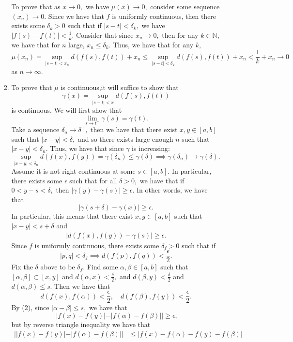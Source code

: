 \documentclass[11pt]{article}
\newcommand{\bbN}{\mathbb{N}}
\begin{document}
\begin{enumerate}
\begin{solution}
\begin{itemize}
\begin{enumerate}
            To prove that as $x\to 0,$ we have $\mu(x)\to 0,$ consider some sequence $(x_n) \to 0.$ Since we have that $f$ is uniformly continuous, then there exists some $\delta_k >0$ such that if $|s-t|< \delta_k,$ we have $|f(s) - f(t)|< \frac{1}{k}.$ Consider that since $x_n \to 0,$ then for any $k \in \bbN,$ we have that for $n$ large, $x_n \leq \delta_k$. Thus, we have that for any $k,$
            \[\mu(x_n) = \sup_{|s-t| < x_n}d(f(s), f(t)) + x_n \leq \sup_{|s-t| < \delta_k}d(f(s), f(t)) + x_n < \frac{1}{k} + x_n \to 0\] as $n\to \infty.$
            \item To prove that $\mu$ is continuous,it will suffice to show that 
            \[\gamma(x) = \sup_{|s-t|< x}d(f(s), f(t))\] is continuous.
            We will first show that 
            \[\lim_{s \to t^-}\gamma(s) = \gamma(t).\] Take a sequence $\delta_n \to \delta^+,$ then we have that there exist $x,y \in [a,b]$ such that $|x-y|< \delta,$ and so there exists large enough $n$ such that $|x-y|< \delta_n.$ Thus, we have that since $\gamma$ is increasing:
            \[\sup_{|x-y|< \delta_n}d(f(x), f(y)) = \gamma(\delta_n)\leq \gamma(\delta)\implies \gamma(\delta_n) \to \gamma(\delta).\]
            Assume it is not right continuous at some $s\in [a,b]$. In particular, there exists some $\epsilon$ such that for all $\delta>0,$ we have that if 
            $0< y-s< \delta,$ then $|\gamma(y) - \gamma(s)|\geq \epsilon.$ In other words, we have that \[|\gamma(s + \delta) - \gamma(x)|\geq \epsilon.\] In particular, this means that there exist $x,y \in [a,b]$ such that $|x-y|< s + \delta$ and \begin{align}
                |d(f(x), f(y)) - \gamma(s)|\geq \epsilon.
            \end{align} Since $f$ is uniformly continuous, there exists some $\delta_f>0$ such that if 
            \[|p, q|< \delta_f \implies d(f(p), f(q)) < \frac{\epsilon}{2}.\]
            Fix the $\delta$ above to be $\delta_f.$
            Find some $\alpha, \beta \in [a,b]$ such that $[\alpha, \beta]\subset [x, y]$ and $d(\alpha, x)< \frac{\delta}{2},$ and $d(\beta, y)< \frac{\delta}{2}$ and $d(\alpha, \beta)\leq s.$ Then we have that 
            \[d(f(x), f(\alpha))< \frac{\epsilon}{2}, \quad d(f(\beta), f(y))< \frac{\epsilon}{2}.\] By (2), since $|\alpha - \beta|\leq s,$ we have that  
            \[||f(x) - f(y)| - |f(\alpha) - f(\beta)|| \geq \epsilon,\] but by reverse triangle inequality we have that 
            \begin{align*}
              ||f(x) - f(y)| - |f(\alpha) - f(\beta)|| &\leq |f(x) - f(\alpha) - f(y) - f(\beta)|\\

\end{align*}
\end{enumerate}
\end{itemize}
\end{solution}
\end{enumerate}
\end{document}
